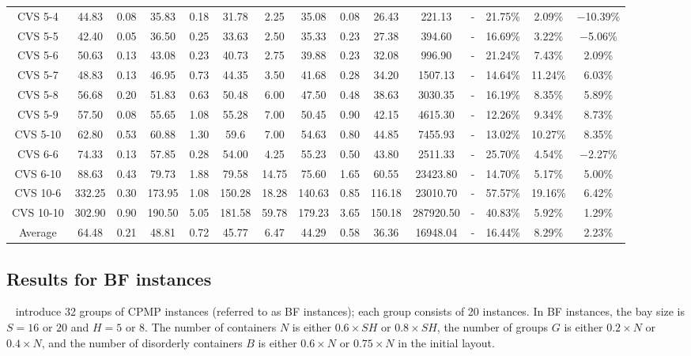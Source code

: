 \documentclass[review,3p,times,12pt,number]{elsarticle}\usepackage{amsmath}\usepackage{amssymb}
\renewcommand{\citet}[1]{\citeauthor{#1}~\citep{#1}}
\begin{document}
\begin{landscape}
\begin{table}[htbp]
\begin{tabular}{ccccccccccccccc}
CVS 5-4   & 44.83  & 0.08 & 35.83  & 0.18 & 31.78  & 2.25 & 35.08  & 0.08  & 26.43 & 221.13  & -    & 21.75\%  & 2.09\%   & $-$10.39\%\\
CVS 5-5   & 42.40  & 0.05 & 36.50  & 0.25 & 33.63  & 2.50 & 35.33  & 0.23  & 27.38 & 394.60  & -    & 16.69\%  & 3.22\%   & $-$5.06\%\\
CVS 5-6   & 50.63  & 0.13 & 43.08  & 0.23 & 40.73  & 2.75 & 39.88  & 0.23  & 32.08 & 996.90  & -    & 21.24\%  & 7.43\%   & 2.09\% \\
CVS 5-7   & 48.83  & 0.13 & 46.95  & 0.73 & 44.35  & 3.50 & 41.68  & 0.28  & 34.20 & 1507.13 & -    & 14.64\%  & 11.24\%  & 6.03\%\\
CVS 5-8   & 56.68  & 0.20 & 51.83  & 0.63 & 50.48  & 6.00 & 47.50  & 0.48  & 38.63 & 3030.35 & -    & 16.19\%  & 8.35\%   & 5.89\%\\
CVS 5-9   & 57.50  & 0.08 & 55.65  & 1.08 & 55.28  & 7.00 & 50.45  & 0.90  & 42.15 & 4615.30 & -    & 12.26\%  & 9.34\%   & 8.73\%\\
CVS 5-10  & 62.80  & 0.53 & 60.88  & 1.30 & 59.6   & 7.00 & 54.63  & 0.80  & 44.85 & 7455.93 & -    & 13.02\%  & 10.27\%  & 8.35\%\\
CVS 6-6   & 74.33  & 0.13 & 57.85  & 0.28 & 54.00  & 4.25 & 55.23  & 0.50  & 43.80 & 2511.33 & -    & 25.70\%   & 4.54\%   & $-$2.27\%\\
CVS 6-10  & 88.63  & 0.43 & 79.73  & 1.88 & 79.58  & 14.75& 75.60  & 1.65  & 60.55 & 23423.80 & -    & 14.70\%   & 5.17\%   & 5.00\%\\
CVS 10-6  & 332.25 & 0.30 & 173.95 & 1.08 & 150.28 & 18.28& 140.63 & 0.85 & 116.18 & 23010.70 & -    & 57.57\%  & 19.16\%  & 6.42\%\\
CVS 10-10 & 302.90 & 0.90 & 190.50 & 5.05 & 181.58 & 59.78&179.23  & 3.65  & 150.18 & 287920.50 & -  & 40.83\%  & 5.92\%   & 1.29\%\\[\defaultaddspace]
Average   & 64.48  & 0.21 & 48.81  & 0.72 & 45.77  & 6.47 &44.29  & 0.58  & 36.36 & 16948.04 & -    & 16.44\%  & 8.29\%   & 2.23\%\\
\bottomrule
\end{tabular}
\end{table}
\end{landscape}
\subsection{Results for BF instances}

\citet{bort2012} introduce 32 groups of CPMP instances (referred to as BF instances); each group consists of 20 instances. In BF instances, the bay size is $S=16$ or $20$ and $H=5$ or $8$. The number of containers $N$ is either $0.6\times SH$ or $0.8\times SH$, the number of groups $G$ is either $0.2\times N$ or $0.4\times N$, and the number of disorderly containers $B$ is either $0.6\times N$ or $0.75\times N$ in the initial layout.
\end{document}
